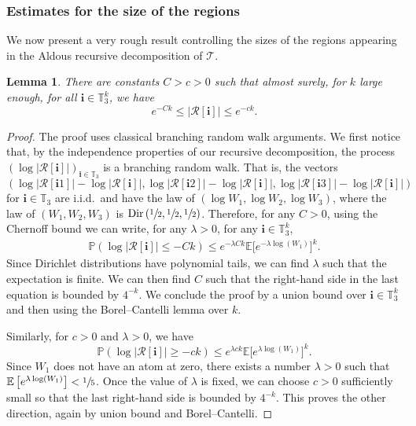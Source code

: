 \documentclass[11pt]{article}
\newcommand{\Ec}[1]{\mathbb{E} \left[#1\right]}
\newcommand{\bEc}[1]{\mathbb{E} \bigl[#1\bigr]}
\newcommand{\Pp}[1]{\mathbb{P} \left(#1\right)}
\newcommand{\Tt}{\mathcal{T}}
\newcommand{\Rr}{\mathcal{R}}
\newcommand{\ii}{\mathbf{i}}
\newcommand{\Dir}{\mathrm{Dir}}
\theoremstyle{plain}
\newtheorem{lemma}[theorem]{Lemma}
\theoremstyle{definition}
\numberwithin{equation}{section}
\begin{document}
\subsubsection*{Estimates for the size of the regions}
We now present a very rough result controlling the sizes of the regions appearing in the Aldous recursive decomposition of $\Tt$.
\begin{lemma}\label{lem:rough_control_size_regions}
There are constants $C>c>0$ such that almost surely, for $k$ large enough, for all $\ii \in \mathbb{T}_3^k$, we have
\[ e^{-Ck} \leq \left| \Rr[\ii ] \right| \leq e^{-ck}. \]
\end{lemma}

\begin{proof}
The proof uses classical branching random walk arguments.
We first notice that, by the independence properties of our recursive decomposition, the process $\left( \log \left| \Rr[\ii ] \right| \right)_{\ii \in \mathbb{T}_3}$ is a branching random walk.
That is, the vectors
\[ \left( \log \left| \Rr[\ii 1] \right|-\log \left| \Rr[\ii ] \right|, \log \left| \Rr[\ii 2] \right|-\log \left| \Rr[\ii ] \right|, \log \left| \Rr[\ii 3] \right|-\log \left| \Rr[\ii ] \right| \right) \]
for $\ii \in \mathbb{T}_3$ are i.i.d.\ and have the law of $\left( \log W_1, \log W_2, \log W_3 \right)$, where the law of $(W_1,W_2,W_3)$ is $\Dir \left( \sfrac{1}{2}, \sfrac{1}{2}, \sfrac{1}{2} \right)$.
Therefore, for any $C>0$, using the Chernoff bound we can write, for any $\lambda>0$, for any $\ii\in \mathbb{T}_3^k$,
\begin{align}\label{eq:chernoff inequality upper bound size regions}
\Pp{\log \left| \Rr[\ii ] \right| \leq -Ck} \leq e^{-\lambda C k} \bEc{e^{-\lambda \log(W_1)}}^k.
\end{align}
Since Dirichlet distributions have polynomial tails, we can find $\lambda$ such that the expectation is finite.
We can then find $C$ such that the right-hand side in the last equation is bounded by $4^{-k}$.
We conclude the proof by a union bound over $\ii \in \mathbb{T}_3^k$ and then using the Borel--Cantelli lemma over $k$.

Similarly, for $c>0$ and $\lambda>0$, we have
\[ \Pp{\log \left| \Rr[\ii ] \right| \geq -ck} \leq e^{\lambda c k} \bEc{e^{\lambda \log(W_1)}}^k. \]
Since $W_1$ does not have an atom at zero, there exists a number $\lambda>0$ such that $\Ec{e^{\lambda \log(W_1)}}<\sfrac{1}{5}$.
Once the value of $\lambda$ is fixed, we can choose $c>0$ sufficiently small so that the last right-hand side is bounded by $4^{-k}$.
This proves the other direction, again by union bound and Borel--Cantelli.
\end{proof}
\end{document}
